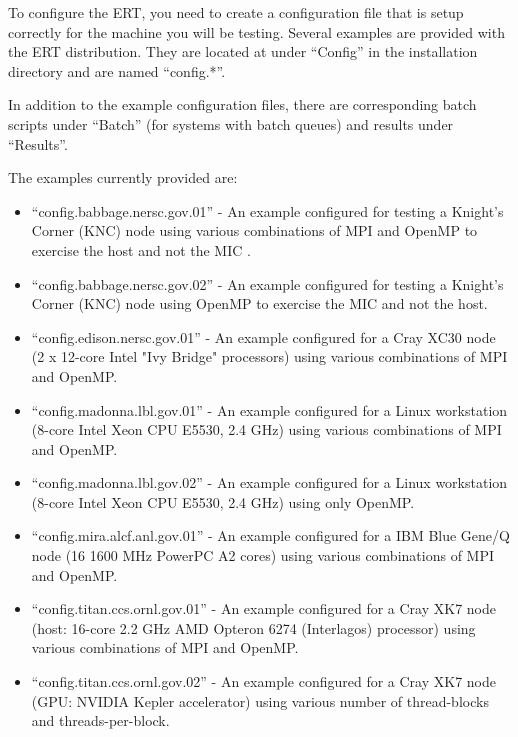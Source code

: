 To configure the ERT, you need to create a configuration file that is setup
correctly for the machine you will be testing.  Several examples
are provided with the ERT distribution.  They are located at under ``Config''
in the installation directory and are named ``config.*''.

In addition to the example configuration files, there are corresponding batch
scripts under ``Batch'' (for systems with batch queues) and results under
``Results''.

The examples currently provided are:

\begin{itemize}

\vspace{-0.1in}
\item{``config.babbage.nersc.gov.01'' - An example configured for testing a
Knight's Corner (KNC) node using various combinations of MPI and OpenMP to
exercise the host and not the MIC .}

\vspace{-0.1in}
\item{``config.babbage.nersc.gov.02'' - An example configured for testing a
Knight's Corner (KNC) node using OpenMP to exercise the MIC and not the host.}

\vspace{-0.1in}
\item{``config.edison.nersc.gov.01'' - An example configured for a
Cray XC30 node (2 x 12-core Intel "Ivy Bridge" processors) using various
combinations of MPI and OpenMP.}

\vspace{-0.1in}
\item{``config.madonna.lbl.gov.01'' - An example configured for a
Linux workstation (8-core Intel Xeon CPU E5530, 2.4 GHz) using various
combinations of MPI and OpenMP.}

\vspace{-0.1in}
\item{``config.madonna.lbl.gov.02'' - An example configured for a
Linux workstation (8-core Intel Xeon CPU E5530, 2.4 GHz) using only OpenMP.}

\vspace{-0.1in}
\item{``config.mira.alcf.anl.gov.01'' - An example configured for a
IBM Blue Gene/Q node (16 1600 MHz PowerPC A2 cores) using various
combinations of MPI and OpenMP.}

\vspace{-0.1in}
\item{``config.titan.ccs.ornl.gov.01'' - An example configured for a
Cray XK7 node (host: 16-core 2.2 GHz AMD Opteron 6274 (Interlagos) processor)
using various combinations of MPI and OpenMP.}

\vspace{-0.1in}
\item{``config.titan.ccs.ornl.gov.02'' - An example configured for a
Cray XK7 node (GPU: NVIDIA Kepler accelerator) using various number of
thread-blocks and threads-per-block.}

\vspace{-0.1in}
\end{itemize}

